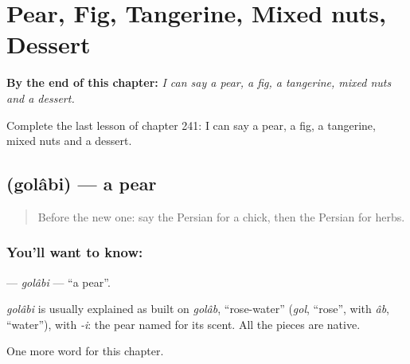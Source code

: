 
\chapter{Pear, Fig, Tangerine, Mixed nuts, Dessert}
\label{ch:fa-pear-fig-tangerine-mixed-nuts-dessert}

\begin{chapteropening}
\textbf{By the end of this chapter:} \emph{I can say a pear, a fig, a tangerine, mixed nuts and a dessert.}

Complete the last lesson of chapter 241: I can say a pear, a fig, a tangerine, mixed nuts and a dessert.
\end{chapteropening}

\section[\texorpdfstring{\fa{گلابی} (golâbi)}{گلابی (golâbi)}]{ (golâbi) — a pear}

\label{lesson:FA-C241-golabi}



\begin{quote}
Before the new one: say the Persian for a chick, then the Persian for herbs.
\end{quote}

\subsection*{You'll want to know: }
\textbf{} — \emph{golâbi} — \textquotedblleft{}a pear\textquotedblright{}.

\begin{cousinweb}
\emph{golâbi} is usually explained as built on \emph{golâb}, \textquotedblleft{}rose-water\textquotedblright{} (\emph{gol}, \textquotedblleft{}rose\textquotedblright{}, with \emph{âb}, \textquotedblleft{}water\textquotedblright{}), with \emph{-i}: the pear named for its scent. All the pieces are native.
\end{cousinweb}

\begin{grammarlens}[title={What you've built}]
One more word for this chapter.
\end{grammarlens}


